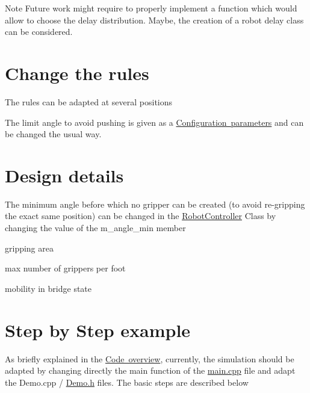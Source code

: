 \begin{DoxyNote}{Note}
Future work might require to properly implement a function which would allow to choose the delay distribution. Maybe, the creation of a robot delay class can be considered.
\end{DoxyNote}
\hypertarget{index_rules}{}\section{Change the rules}\label{index_rules}
The rules can be adapted at several positions
\begin{DoxyItemize}
\item The limit angle to avoid pushing is given as a \mbox{\hyperlink{index_param}{Configuration parameters}} and can be changed the usual way.
\end{DoxyItemize}\hypertarget{index_design}{}\section{Design details}\label{index_design}

\begin{DoxyItemize}
\item The minimum angle before which no gripper can be created (to avoid re-\/gripping the exact same position) can be changed in the \mbox{\hyperlink{class_robot_controller}{Robot\+Controller}} Class by changing the value of the m\+\_\+angle\+\_\+min member
\item gripping area
\item max number of grippers per foot
\item mobility in bridge state
\end{DoxyItemize}\hypertarget{index_ex}{}\section{Step by Step example}\label{index_ex}
As briefly explained in the \mbox{\hyperlink{index_struct}{Code overview}}, currently, the simulation should be adapted by changing directly the main function of the \mbox{\hyperlink{main_8cpp}{main.\+cpp}} file and adapt the Demo.\+cpp / \mbox{\hyperlink{_demo_8h}{Demo.\+h}} files. The basic steps are described below

